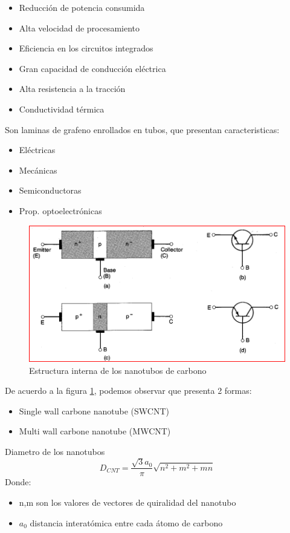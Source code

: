 \documentclass[conference]{IEEEtran} %
\begin{document}
	\begin{itemize}
		\item Reducción de potencia consumida 
		\item Alta velocidad de procesamiento
		\item Eficiencia en los circuitos integrados 
		\item Gran capacidad de conducción eléctrica 
		\item Alta resistencia a la tracción
		\item Conductividad térmica
	\end{itemize}

		Son laminas de grafeno enrollados en tubos, que presentan caracteristicas: 
		\begin{itemize}
			\item Eléctricas
			\item Mecánicas
			\item Semiconductoras
			\item Prop. optoelectrónicas
		\end{itemize}




	\begin{figure}[!h] 
		\centering
		\includegraphics[scale=0.7]{IMAGENES/1.PNG}
		\caption{Estructura interna de los nanotubos de carbono \cite{Prasad}}
		\label{f_4}
	\end{figure}
	De acuerdo a la figura \ref{f_4}, podemos observar que presenta 2 formas:
	\begin{itemize}
		\item Single wall carbone nanotube (SWCNT)
		\item Multi wall carbone nanotube (MWCNT)
	\end{itemize}



Diametro de los nanotubos
		\begin{equation}
			D_{CNT} =  \frac{\sqrt{3}a_0}{\pi}\sqrt{n^2 + m^2 + mn}
		\end{equation}
		Donde:
		\begin{itemize}
			\item n,m son los valores de vectores de quiralidad del nanotubo
			\item $a_0$ distancia interatómica entre cada átomo de carbono
		\end{itemize}
\end{document}

